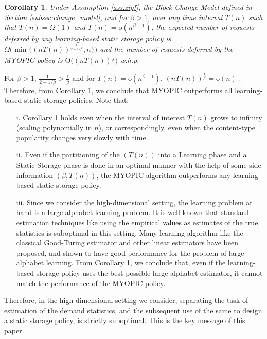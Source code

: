 \documentclass[10pt, conference, letterpaper]{IEEEtran}
\newtheorem{corollary}{Corollary}
\def \OO {\mathrm{O}}
\def \oo {\mathrm{o}}
\begin{document}
\begin{corollary}
	\label{cor:MYOPIC_static_arrival_rates}
	Under Assumption \ref{ass:zipf}, the Block Change Model defined in
	Section \ref{subsec:change_model}, and for $\beta > 1$, over any time
	interval $T(n)$ such that $T(n) = \Omega(1)$ and $T(n) =
	\oo(n^{\beta-1})$, the expected number of requests deferred by
	any learning-based static storage policy is  $\Omega\big(\min\{(nT(n))^{\frac{1}{2-1/\beta}},n\}\big)$ and the
	number of requests deferred by the MYOPIC policy is $\OO\big((nT(n))^{\frac{1}{\beta}}\big)$
	w.h.p.
\end{corollary}

For $\beta > 1$, $\frac{1}{2-1/\beta} > \frac{1}{\beta}$ and for $T(n) =
\oo(n^{\beta-1})$, $(nT(n))^{\frac{1}{\beta}} = \oo(n)$ . Therefore,
from Corollary \ref{cor:MYOPIC_static_arrival_rates}, we conclude that
MYOPIC outperforms all learning-based static storage policies. Note
that:
\begin{itemize}
	\item[i.] Corollary \ref{cor:MYOPIC_static_arrival_rates} holds even
	when the interval of interest $T(n)$ grows to infinity (scaling
	polynomially in $n$), or correspondingly, even when the content-type
	popularity changes very slowly with time.
	
	\item[ii.] Even if the partitioning of the $(T(n))$ into a Learning
	phase and a Static Storage phase is done in an optimal manner with
	the help of some side information $(\beta, T(n))$, the MYOPIC
	algorithm outperforms any learning-based static storage policy.
	
	\item[iii.] Since we consider the high-dimensional setting, the
	learning problem at hand is a large-alphabet learning problem. It is
	well known that standard estimation techniques like using the
	empirical values as estimates of the true statistics is suboptimal
	in this setting. Many learning algorithm like the classical
	Good-Turing estimator \cite{MS00} and other linear estimators
	\cite{VV11} have been proposed, and shown to have good performance
	for the problem of large-alphabet learning. From Corollary
	\ref{cor:MYOPIC_static_arrival_rates}, we conclude that, even if the
	learning-based storage policy uses the best possible large-alphabet
	estimator, it cannot match the performance of the MYOPIC policy.
\end{itemize}


Therefore, in the high-dimensional setting we consider, separating the
task of estimation of the  demand statistics, and the subsequent use
of the same to design a static storage policy, is strictly
suboptimal. This is the key message of this paper.\\
\end{document}
